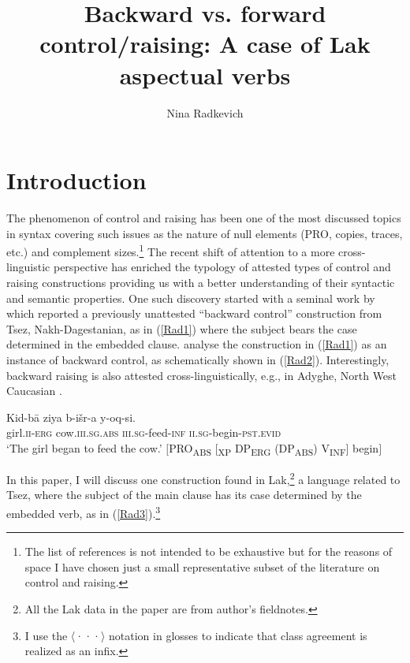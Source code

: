 \documentclass[output=paper]{langscibook}
\author{Nina Radkevich\affiliation{University of York}}
\title{Backward vs. forward control/raising: A case of Lak aspectual verbs}
\begin{document}
\maketitle

\section{Introduction}
The phenomenon of control and raising has been one of the most discussed topics in syntax \citep{hornstein1999,Landau2001,Landau2003,Landau2004,martin2001,BoeckxHornstein2003,BoeckxHornstein2004,DaviesDubinsky2004,Wurmbrand1999,wurmbrand2001,Wurmbrand2007} covering such issues as the nature of null elements (PRO, copies, traces, etc.) and complement sizes.\footnote{The list of references is not intended to be exhaustive but for the reasons of space I have chosen just a small representative subset of the literature on control and raising.} The recent shift of attention to a more cross-linguistic perspective  has enriched the typology of attested types of control and raising constructions providing us with a better understanding of their syntactic and semantic properties. One such discovery started with a seminal work by \citet{PolinskyPotsdam2002} which reported a previously unattested “backward control” construction from Tsez, Nakh-Dagestanian, as in (\ref{Rad1}) where the subject bears the case determined in the embedded clause. \citet{PolinskyPotsdam2002} analyse the construction in (\ref{Rad1}) as an instance of backward control, as schematically shown in (\ref{Rad2}). Interestingly, backward raising is also attested cross-linguistically, e.g., in Adyghe, North West Caucasian \citep{PotsdamPolinsky2012}.  

\ea\label{Rad1}
\gll Kid-bā ziya b-išr-a y-oq-si. \\
girl.\textsc{ii-erg} 		cow\textsc{.iii.sg.abs} 	\textsc{iii.sg}-feed-\textsc{inf} \textsc{ii.sg}-begin-\textsc{pst.evid}\\
\glt ‘The girl began to feed the cow.’    \citep[248]{PolinskyPotsdam2002}
\ex\label{Rad2}
$[$PRO\textsubscript{ABS}  $[$\textsubscript{XP} DP\textsubscript{ERG}  (DP\textsubscript{ABS})  V\textsubscript{INF}$]$  begin$]$\\
\z


In this paper, I will discuss one construction found in Lak,\footnote{All the Lak data in the paper are from author's fieldnotes.} a language related to Tsez, where the subject of the main clause has its case determined by the embedded verb, as in (\ref{Rad3}).\footnote{I use the 〈···〉 notation in glosses to indicate that class agreement is realized as an infix.} 
\end{document}
